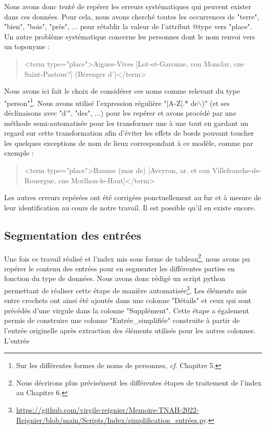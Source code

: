 \documentclass[a4paper,12pt,twoside]{book}
\begin{document}
	\noindent Nous avons donc tenté de repérer les erreurs systématiques qui peuvent exister dans ces données. Pour cela, nous avons cherché toutes les occurrences de "terre", "bien", "bois", "près", ... pour rétablir la valeur de l'attribut @type vers "place". Un autre problème systématique concerne les personnes dont le nom renvoi vers un toponyme :
	
	\begin{quotation}
		<term type="place">Aigues-Vives [Lot-et-Garonne, con Monclar, cne Saint-Pastour?]
			(Bérenger d')</term>
	\end{quotation}

	\noindent Nous avons ici fait le choix de considérer ces noms comme relevant du type "person"\footnote{Sur les différentes formes de noms de personnes, \textit{cf}. Chapitre 5.}. Nous avons utilisé l'expression régulière "[A-Z].* de$\backslash$)" (et ses déclinaisons avec "d'", "des", ...) pour les repérer et avons procédé par une méthode semi-automatisée pour les transformer une à une tout en gardant un regard sur cette transformation afin d'éviter les effets de bords pouvant toucher les quelques exceptions de nom de lieux correspondant à ce modèle, comme par exemple :
	
	\begin{quotation}
    	<term type="place">Bannes (mas de) [Aveyron, ar. et con Villefranche-de-Rouergue,
			cne Morlhon-le-Haut]</term>
	\end{quotation}
	
	\noindent Les autres erreurs repérées ont été corrigées ponctuellement au fur et à mesure de leur identification au cours de notre travail. Il est possible qu'il en existe encore.
	
	\subsection{Segmentation des entrées}
	
	Une fois ce travail réalisé et l'index mis sous forme de tableau\footnote{Nous décrirons plus précisément les différentes étapes de traitement de l'index au Chapitre 6.}, nous avons pu repérer le contenu des entrées pour en segmenter les différentes parties en fonction du type de données. Nous avons donc rédigé un script python permettant de réaliser cette étape de manière automatisée\footnote{\url{https://github.com/virgile-reignier/Memoire-TNAH-2022-Reignier/blob/main/Scripts/Index/simplification_entrées.py}.}. Les éléments mis entre crochets ont ainsi été ajoutés dans une colonne "Détails" et ceux qui sont précédés d'une virgule dans la colonne "Supplément". Cette étape a également permis de construire une colonne "Entrée\_simplifiée" construite à partir de l'entrée originelle après extraction des éléments utilisés pour les autres colonnes. L'entrée 
	
\end{document}
